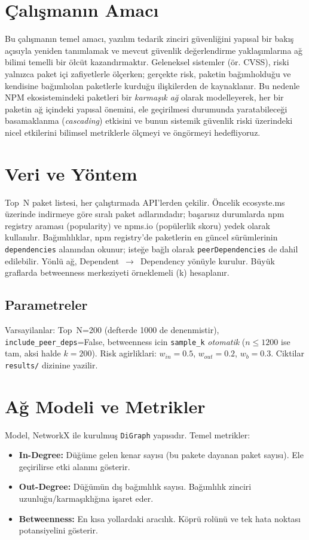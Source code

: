 \documentclass[11pt,a4paper]{article}
\begin{document}
\section{\c{C}al\i\c{s}man\i n Amac\i}
Bu \c{c}al\i\c{s}man\i n temel amac\i, yaz\i l\i m tedarik zinciri g\"uvenli\u{g}ini yap\i sal bir bak\i\c{s} a\c{c}\i s\i yla yeniden tan\i mlamak ve mevcut g\"uvenlik de\u{g}erlendirme yakla\c{s}\i mlar\i na a\u{g} bilimi temelli bir \"o\l c\"ut kazand\i rmakt\i r. Geleneksel sistemler (\"or. CVSS), riski yaln\i zca paket i\c{c}i zafiyetlerle \"ol\c{c}erken; ger\c{c}ekte risk, paketin ba\u{g}\i ml\i oldu\u{g}u ve kendisine ba\u{g}\i ml\i olan paketlerle kurdu\u{g}u ili\c{s}kilerden de kaynaklan\i r. Bu nedenle NPM ekosistemindeki paketleri bir \emph{karma\c{s}\i k a\u{g}} olarak modelleyerek, her bir paketin a\u{g} i\c{c}indeki yap\i sal \"onemini, ele ge\c{c}irilmesi durumunda yaratabilece\u{g}i basamaklanma (\emph{cascading}) etkisini ve bunun sistemik g\"uvenlik riski \"uzerindeki nicel etkilerini bilimsel metriklerle \"ol\c{c}meyi ve \"ong\"ormeyi hedefliyoruz.


\section{Veri ve Yöntem}
Top~N paket listesi, her çalıştırmada API'lerden çekilir. Öncelik ecosyste.ms üzerinde indirmeye göre sıralı paket adlarındadır; başarısız durumlarda npm registry araması (popularity) ve npms.io (popülerlik skoru) yedek olarak kullanılır. Bağımlılıklar, npm registry'de paketlerin en güncel sürümlerinin \texttt{dependencies} alanından okunur; isteğe bağlı olarak \texttt{peerDependencies} de dahil edilebilir. Yönlü ağ, Dependent~$\to$~Dependency yönüyle kurulur. Büyük graflarda betweenness merkeziyeti örneklemeli (k) hesaplanır.



\subsection{Parametreler}
Varsayilanlar: Top~N=200 (defterde 1000 de denenmistir), \texttt{include\_peer\_deps}=False, betweenness icin \texttt{sample\_k} \emph{otomatik} ($n\leq 1200$ ise tam, aksi halde $k=200$). Risk agirliklari: $w_{in}=0.5$, $w_{out}=0.2$, $w_b=0.3$. Ciktilar \texttt{results/} dizinine yazilir.
\section{Ağ Modeli ve Metrikler}
Model, NetworkX ile kurulmuş \texttt{DiGraph} yapısıdır. Temel metrikler:
\begin{itemize}
  \item \textbf{In-Degree:} Düğüme gelen kenar sayısı (bu pakete dayanan paket sayısı). Ele geçirilirse etki alanını gösterir.
  \item \textbf{Out-Degree:} Düğümün dış bağımlılık sayısı. Bağımlılık zinciri uzunluğu/karmaşıklığına işaret eder.
  \item \textbf{Betweenness:} En kısa yollardaki aracılık. Köprü rolünü ve tek hata noktası potansiyelini gösterir.
\end{itemize}
\end{document}
